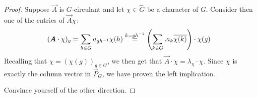     \begin{proof}
        Suppose \(\vec{A}\) is \(G\)-circulant and let \(\chi\in\hat{G}\) be a character of \(G\). Consider then one of the entries of \(\vec{A}\chi\):
        \begin{align*}
            (\boldsymbol{A}\cdot\chi)_g = \sum\limits_{h\in G}a_{gh^{-1}}\chi(h) \stackrel{k = gh^{-1}}{=} \left( \sum\limits_{k\in G}. a_k\overline{\chi(k)}\right)\cdot\chi(g)
        \end{align*}
        Recalling that \(\chi = (\chi(g))_{g\in G}\), we then get that \(\vec{A}\cdot \chi = \lambda_\chi\cdot \chi\). Since \(\chi\) is exactly the column vector in \(\vec{P}_G\), we have proven the left implication.\par
        Convince yourself of the other direction.
    \end{proof}
    
